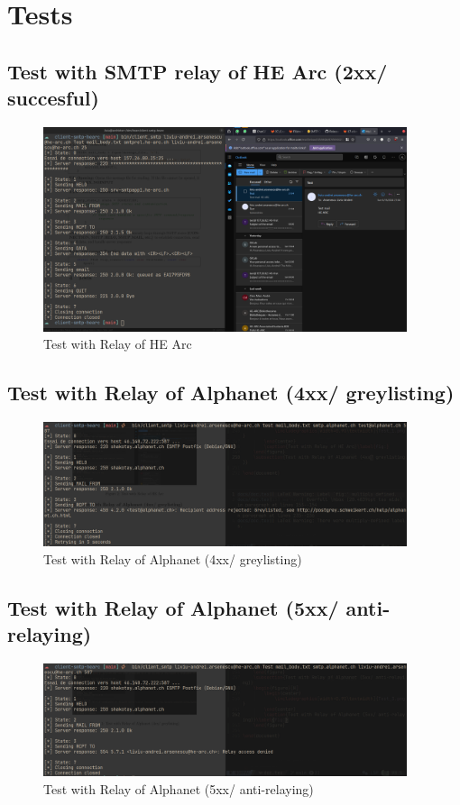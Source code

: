 \documentclass[12pt,a4paper]{article}
\begin{document}
    \section{Tests}
    \subsection{Test with SMTP relay of HE Arc (2xx/ succesful)}
    \begin{figure}[H]
        \begin{center}
            \includegraphics[width=0.95\textwidth]{Test_1.png}
        \end{center}
        \caption{Test with Relay of HE Arc}\label{fig:}
    \end{figure}
    \subsection{Test with Relay of Alphanet (4xx/ greylisting)}
    \begin{figure}[H]
        \begin{center}
            \includegraphics[width=0.95\textwidth]{Test_2.png}
        \end{center}
        \caption{Test with Relay of Alphanet (4xx/ greylisting)}\label{fig:}
    \end{figure}
    \subsection{Test with Relay of Alphanet (5xx/ anti-relaying)}
    \begin{figure}[H]
        \begin{center}
            \includegraphics[width=0.95\textwidth]{Test_3.png}
        \end{center}
        \caption{Test with Relay of Alphanet (5xx/ anti-relaying)}\label{fig:}
    \end{figure}
    
\end{document}
